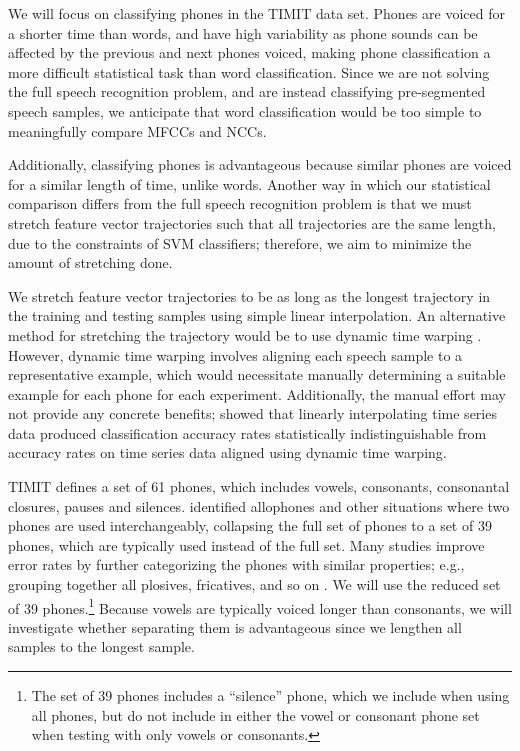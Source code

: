We will focus on classifying
phones in the TIMIT data set.
Phones are voiced
for a shorter time than words,
and have high variability
as phone sounds can be affected
by the previous and next phones voiced,
making phone classification
a more difficult statistical task
than word classification.
Since we are not solving the full
speech recognition problem,
and are instead classifying
pre-segmented speech samples,
we anticipate that word classification
would be too simple to meaningfully
compare MFCCs and NCCs.

Additionally, classifying phones
is advantageous because similar phones
are voiced for a similar length of time,
unlike words.
Another way in which our statistical comparison
differs from the full speech recognition problem
is that we must stretch
feature vector trajectories
such that all trajectories are the same length,
due to the constraints of SVM classifiers;
therefore,
we aim to minimize the amount
of stretching done.

We stretch feature vector trajectories
to be as long as the longest trajectory
in the training and testing samples
using simple linear interpolation.
An alternative method
for stretching the trajectory
would be to use dynamic time warping
\citep{ratanamahatana2004}.
However, dynamic time warping
involves aligning each speech sample
to a representative example,
which would necessitate manually
determining a suitable example
for each phone for each experiment.
Additionally, the manual effort may not
provide any concrete benefits;
\citeauthor{ratanamahatana2004}
showed that linearly interpolating
time series data
produced classification accuracy rates
statistically indistinguishable
from accuracy rates on time series data
aligned using dynamic time warping.

TIMIT defines a set of 61 phones,
which includes vowels, consonants,
consonantal closures, pauses and silences.
\citet{lee1989} identified allophones and
other situations where two phones
are used interchangeably,
collapsing the full set of phones
to a set of 39 phones,
which are typically used
instead of the full set.
Many studies improve error rates
by further categorizing
the phones with similar properties;
e.g., grouping together all
plosives, fricatives, and so on
\citep{lopes2011}.
We will use the reduced set of 39 phones.\footnote{
  The set of 39 phones includes a ``silence'' phone,
  which we include when using all phones,
  but do not include in either
  the vowel or consonant phone set
  when testing with only vowels or consonants.}
Because vowels are typically voiced
longer than consonants,
we will investigate whether
separating them is advantageous
since we lengthen all samples
to the longest sample.

